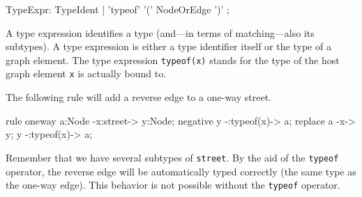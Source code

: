 \begin{rail}
  TypeExpr: TypeIdent | 'typeof' '(' NodeOrEdge ')' ;
\end{rail}
A type expression identifies a type (and---in terms of matching---also its subtypes).
A type expression is either a type identifier itself or the type of a graph element.
The type expression \texttt{typeof(x)} stands for the type of the host graph element \texttt{x} is actually bound to.
\begin{example}
The following rule will add a reverse edge to a one-way street.
\begin{grgen}
rule oneway {
    a:Node -x:street-> y:Node;
    negative {
        y -:typeof(x)-> a;
    }
    replace {
        a -x-> y;
        y -:typeof(x)-> a;
    }
}
\end{grgen}
Remember that we have several subtypes of \texttt{street}. By the aid of the \texttt{typeof} operator, the reverse edge will be automatically typed correctly (the same type as the one-way edge). This behavior is not possible without the \texttt{typeof} operator.
\end{example}

